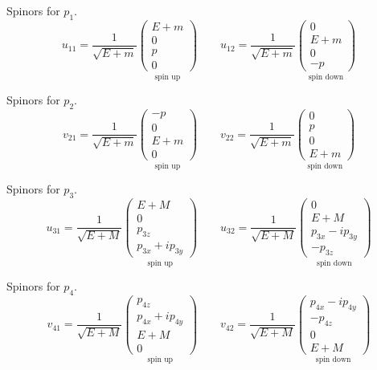 Spinors for $p_1$.
\begin{equation*}
u_{11}=\frac{1}{\sqrt{E+m}}
\underset{\text{spin up}}
{\begin{pmatrix}E+m\\0\\p\\0\end{pmatrix}}
\qquad
u_{12}=\frac{1}{\sqrt{E+m}}
\underset{\text{spin down}}
{\begin{pmatrix}0\\E+m\\0\\-p\end{pmatrix}}
\end{equation*}

Spinors for $p_2$.
\begin{equation*}
v_{21}=\frac{1}{\sqrt{E+m}}
\underset{\text{spin up}}
{\begin{pmatrix}-p\\0\\E+m\\0\end{pmatrix}}
\qquad
v_{22}=\frac{1}{\sqrt{E+m}}
\underset{\text{spin down}}
{\begin{pmatrix}0\\p\\0\\E+m\end{pmatrix}}
\end{equation*}

Spinors for $p_3$.
\begin{equation*}
u_{31}=\frac{1}{\sqrt{E+M}}
\underset{\text{spin up}}
{\begin{pmatrix}E+M\\0\\p_{3z}\\p_{3x}+ip_{3y}\end{pmatrix}}
\qquad
u_{32}=\frac{1}{\sqrt{E+M}}
\underset{\text{spin down}}
{\begin{pmatrix}0\\E+M\\p_{3x}-ip_{3y}\\-p_{3z}\end{pmatrix}}
\end{equation*}

Spinors for $p_4$.
\begin{equation*}
v_{41}=\frac{1}{\sqrt{E+M}}
\underset{\text{spin up}}
{\begin{pmatrix}p_{4z}\\p_{4x}+ip_{4y}\\E+M\\0\end{pmatrix}}
\qquad
v_{42}=\frac{1}{\sqrt{E+M}}
\underset{\text{spin down}}
{\begin{pmatrix}p_{4x}-ip_{4y}\\-p_{4z}\\0\\E+M\end{pmatrix}}
\end{equation*}

